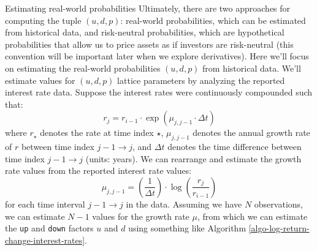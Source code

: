 \documentclass[11pt]{article}
\makeatletter
\theoremstyle{definition}
\renewcommand\subsubsection{\@startsection
	{subsubsection}{2}{0mm}
	{-0.05in}
	{-0.5\baselineskip}
	{\normalfont\normalsize\itshape\bfseries}}
\makeatother
\begin{document}
\subsubsection{Estimating real-world probabilities}
Ultimately, there are two approaches for computing the tuple $(u,d,p)$: real-world probabilities, which can be estimated from historical data, and risk-neutral probabilities, 
which are hypothetical probabilities that allow us to price assets as if investors are risk-neutral (this convention will be important later when we explore derivatives). 
Here we'll focus on estimating the real-world probabilities $(u,d,p)$ from historical data.
We'll estimate values for $(u,d,p)$ lattice parameters by analyzing the reported interest rate data. 
Suppose the interest rates were continuously compounded such that:
\begin{equation}
r_{j} = r_{i-1}\cdot\exp\left(\mu_{j,j-1}\cdot\Delta{t}\right)
\end{equation}
where $r_{\star}$ denotes the rate at time index $\star$, $\mu_{j,j-1}$ denotes the annual growth rate of $r$ between time index 
$j-1\rightarrow{j}$, and $\Delta{t}$ denotes the time difference between time index $j - 1\rightarrow{j}$ (units: years). 
We can rearrange and estimate the growth rate values from the reported interest rate values:
\begin{equation}
\mu_{j,j-1} = \left(\frac{1}{\Delta{t}}\right)\cdot\log\left(\frac{r_{j}}{r_{i-1}}\right)
\end{equation}
for each time interval $j - 1\rightarrow{j}$ in the data. Assuming we have $N$ observations, we can estimate $N-1$ values for the 
growth rate $\mu$, from which we can estimate the \texttt{up} and \texttt{down} factors $u$ and $d$ using something like Algorithm \ref{algo-log-return-change-interest-rates}.
\end{document}
